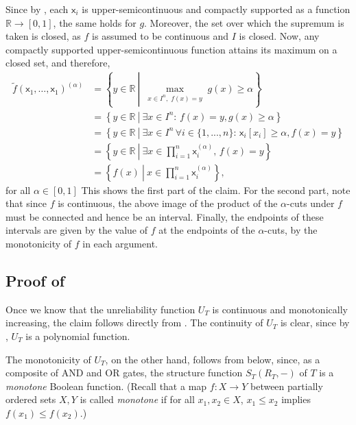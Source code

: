 \documentclass[runningheads]{llncs}
\renewcommand{\emph}[1]{{\it #1}}
\begin{document}
Since by , each $\mathsf{x}_i$ is upper-semicontinuous and compactly supported as a function $\mathbb{R} \to [0,1]$, the same holds for $g$. 
Moreover, the set over which the supremum is taken is closed, as $f$ is assumed to be continuous and $I$ is closed.
Now, any compactly supported upper-semicontinuous function attains its maximum on a closed set, and therefore,
\begin{align*}
    \widetilde{f}(\mathsf{x}_1, \dots, \mathsf{x}_1)^{(\alpha)}
    &= \left\{y\in \mathbb{R} \:\left\vert\:  \underset{\substack{x \in I^n,\;
    f(x)=y}}{\max}g(x)  \geq \alpha \right. \right\} \\
    &= \left\{y\in \mathbb{R} \:\left\vert\:  \exists x \in I^n: \,f(x)=y, g(x)\geq \alpha \right. \right\} \\
    &= \left\{y\in \mathbb{R} \:\left\vert\:  \exists x \in I^n\, \forall i\in\{1,..., n\}:\, \mathsf{x}_i[x_i]\geq \alpha, f(x)=y \right. \right\} \\
    &= \left\{y\in \mathbb{R} \:\left\vert\:  \exists x \in \prod_{i=1}^n \mathsf{x}_i^{(\alpha)},\, f(x)=y \right. \right\} \\
    &= \left\{f(x) \:\left\vert\: x \in \prod_{i=1}^n \mathsf{x}_i^{(\alpha)} \right. \right\},
\end{align*}
for all $\alpha\in [0,1]$
This shows the first part of the claim. For the second part, note that since $f$ is continuous, the above image of the product of the $\alpha$-cuts under $f$ must be connected and hence be an interval. Finally, the endpoints of these intervals are given by the value of $f$ at the endpoints of the $\alpha$-cuts, by the monotonicity of $f$ in each argument.

\subsection{Proof of }\label{sec:proof-DAG-algo}

Once we know that the unreliability function $U_T$ is continuous and monotonically increasing, the claim follows directly from . The continuity of $U_T$ is clear, since by , $U_T$ is a polynomial function.

The monotonicity of $U_T$, on the other hand, follows from  below, since, as a composite of AND and OR gates, the structure function $S_T(R_T, -)$ of $T$ is a \emph{monotone} Boolean function. (Recall that a map $f:X\to Y$ between partially ordered sets $X,Y$ is called \emph{monotone} 
if for all $x_1, x_2\in X$, $x_1\leq x_2$ implies $f(x_1)\leq f(x_2)$.)
\end{document}
